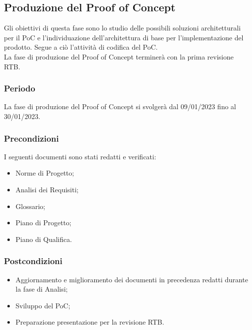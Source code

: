 \subsection{Produzione del Proof of Concept}
Gli obiettivi di questa fase sono lo studio delle possibili soluzioni architetturali per il PoC e l’individuazione dell’architettura di base per l’implementazione del prodotto. Segue a ciò l’attività di codifica del PoC.\\
La fase di produzione del Proof of Concept terminerà con la prima revisione RTB.

\subsubsection{Periodo}
La fase di produzione del Proof of Concept si svolgerà dal 09/01/2023 fino al 30/01/2023.

\subsubsection{Precondizioni}
I seguenti documenti sono stati redatti e verificati:
\begin{itemize}
	\item Norme di Progetto;
	\item Analisi dei Requisiti;
	\item Glossario;
    \item Piano di Progetto;
	\item Piano di Qualifica.
\end{itemize}

\subsubsection{Postcondizioni}
\begin{itemize}
	\item Aggiornamento e miglioramento dei documenti in precedenza redatti durante la fase di Analisi;
	\item Sviluppo del PoC;
	\item Preparazione presentazione per la revisione RTB.
\end{itemize}

